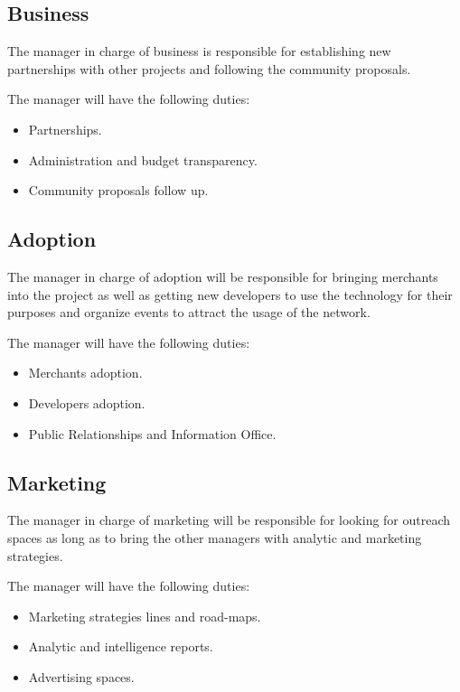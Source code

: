 \documentclass{article}
\begin{document}
\subsection{Business}

The manager in charge of business is responsible for establishing new partnerships with other projects and following the community proposals.

The manager will have the following duties:

\begin{itemize}
  \item Partnerships.
  \item Administration and budget transparency.
  \item Community proposals follow up.
\end{itemize}

\subsection{Adoption}

The manager in charge of adoption will be responsible for bringing merchants into the project as well as getting new developers to use the technology for their purposes and organize events to attract the usage of the network.

The manager will have the following duties:

\begin{itemize}
  \item Merchants adoption.
  \item Developers adoption.
  \item Public Relationships and Information Office.
\end{itemize}

\subsection{Marketing}

The manager in charge of marketing will be responsible for looking for outreach spaces as long as to bring the other managers with analytic and marketing strategies.

The manager will have the following duties:

\begin{itemize}
  \item Marketing strategies lines and road-maps.
  \item Analytic and intelligence reports.
  \item Advertising spaces.
\end{itemize}
\end{document}
